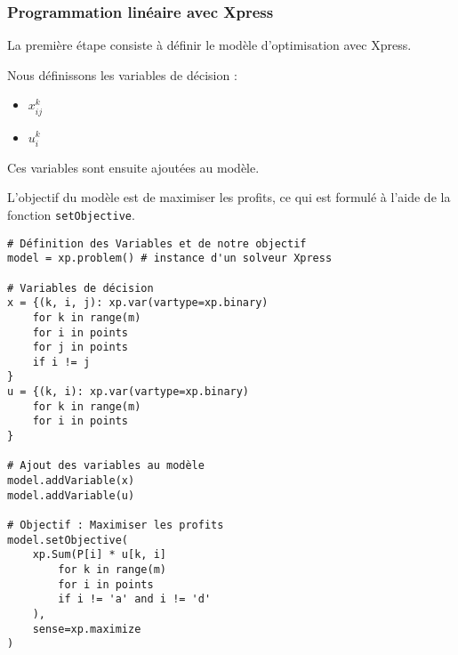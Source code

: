 \documentclass[a4paper, 12pt, DIV=12]{scrartcl}
\begin{document}
\subsubsection{Programmation linéaire avec Xpress}
La première étape consiste à définir le modèle d'optimisation avec Xpress.

Nous définissons les variables de décision :\\
\begin{itemize}
    \item $x_{ij}^k$
    \item \textbf{$u_i^k$}
\end{itemize}
Ces variables sont ensuite ajoutées au modèle.

L'objectif du modèle est de maximiser les profits, ce qui est formulé à l'aide de la fonction \texttt{setObjective}. 

\begin{minipage}{\textwidth}
\begin{verbatim}
# Définition des Variables et de notre objectif
model = xp.problem() # instance d'un solveur Xpress

# Variables de décision
x = {(k, i, j): xp.var(vartype=xp.binary) 
    for k in range(m) 
    for i in points 
    for j in points 
    if i != j
}
u = {(k, i): xp.var(vartype=xp.binary) 
    for k in range(m) 
    for i in points
}

# Ajout des variables au modèle
model.addVariable(x)
model.addVariable(u)

# Objectif : Maximiser les profits
model.setObjective(
    xp.Sum(P[i] * u[k, i] 
        for k in range(m) 
        for i in points 
        if i != 'a' and i != 'd'
    ),
    sense=xp.maximize
)
\end{verbatim}
\end{minipage}%
\newpage
\end{document}
